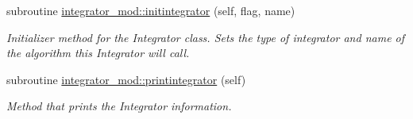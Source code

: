\begin{DoxyCompactItemize}
subroutine \mbox{\hyperlink{namespaceintegrator__mod_acb397b27678b3fb5f9d6b0021b5ab058}{integrator\+\_\+mod\+::initintegrator}} (self, flag, name)
\begin{DoxyCompactList}\small\item\em Initializer method for the Integrator class. Sets the type of integrator and name of the algorithm this Integrator will call. \end{DoxyCompactList}\item 
subroutine \mbox{\hyperlink{namespaceintegrator__mod_a6c1df4442c3a9bdef68a4f2f95a403cd}{integrator\+\_\+mod\+::printintegrator}} (self)
\begin{DoxyCompactList}\small\item\em Method that prints the Integrator information. \end{DoxyCompactList}\end{DoxyCompactItemize}
